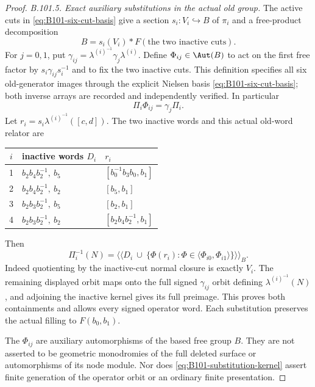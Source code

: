 \begin{proof}
\emph{B.101.5. Exact auxiliary substitutions in the actual old group.}
The active cuts in \eqref{eq:B101-six-cut-basis} give a section
$s_i:V_i\hookrightarrow B$ of $\pi_i$ and a free-product decomposition
\[
 B=s_i(V_i)*F(\text{the two inactive cuts}).
\]
For $j=0,1$, put
$\gamma_{ij}=\lambda^{(i)}^{-1}\gamma_j\lambda^{(i)}$.
Define $\Phi_{ij}\in\Aut(B)$ to act on the first free factor by
$s_i\gamma_{ij}s_i^{-1}$ and to fix the two inactive cuts.
This definition specifies all six old-generator images through the
explicit Nielsen basis \eqref{eq:B101-six-cut-basis}; both inverse
arrays are recorded and independently verified.
In particular
\begin{equation}\label{eq:B101-substitution-diagram}
 \Pi_i\Phi_{ij}=\gamma_j\Pi_i.
\end{equation}
Let $r_i=s_i\lambda^{(i)}^{-1}([c,d])$.
The two inactive words and this actual old-word relator are
\begin{center}
\begin{tabular}{c@{\quad}ll}
\toprule
$i$&inactive words $D_i$&$r_i$\\
\midrule
1&$b_2b_4b_2^{-1},\ b_5$&$[b_0^{-1}b_3b_0,b_1]$\\
2&$b_2b_4b_2^{-1},\ b_2$&$[b_5,b_1]$\\
3&$b_2b_3b_2^{-1},\ b_5$&$[b_2,b_1]$\\
4&$b_2b_3b_2^{-1},\ b_2$&$[b_2b_4b_2^{-1},b_1]$\\
\bottomrule
\end{tabular}
\end{center}
Then
\begin{equation}\label{eq:B101-substitution-kernel}
 \Pi_i^{-1}(N)=
 \big\langle\!\big\langle
 D_i\ \cup\ \{\Phi(r_i):\Phi\in
                    \langle\Phi_{i0},\Phi_{i1}\rangle\}
 \big\rangle\!\big\rangle_B.
\end{equation}
Indeed quotienting by the inactive-cut normal closure is exactly
$V_i$.  The remaining displayed orbit maps onto the full signed
$\gamma_{ij}$ orbit defining $\lambda^{(i)}^{-1}(N)$, and adjoining
the inactive kernel gives its full preimage.  This proves both
containments and allows every signed operator word.
Each substitution preserves the actual filling to $F(b_0,b_1)$.

The $\Phi_{ij}$ are auxiliary automorphisms of the based free group
$B$.  They are not asserted to be geometric monodromies of the
full deleted surface or automorphisms of its node module.
Nor does \eqref{eq:B101-substitution-kernel} assert finite generation
of the operator orbit or an ordinary finite presentation.


\end{proof}

